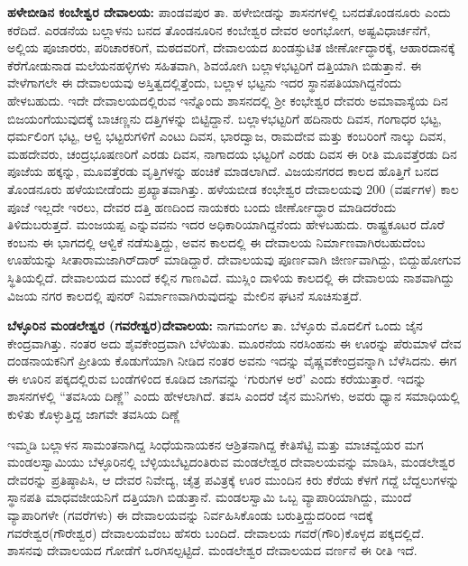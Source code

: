 \textbf{ಹಳೇಬೀಡಿನ ಕಂಬೇಶ್ವರ ದೇವಾಲಯ:} ಪಾಂಡವಪುರ ತಾ. ಹಳೇಬೀಡನ್ನು ಶಾಸನಗಳಲ್ಲಿ ಬನದತೊಂಡನೂರು ಎಂದು ಕರೆದಿದೆ. ಎರಡನೆಯ ಬಲ್ಲಾಳನು ಬನದ ತೊಂಡನೂರಿನ ಕಂಬೇಶ್ವರ ದೇವರ ಅಂಗಭೋಗ, ಅಷ್ಟವಿಧಾರ್ಚನೆಗೆ, ಅಲ್ಲಿಯ ಪೂಜಾರರು, ಪರಿಚಾರಕರಿಗೆ, ಮಠದವರಿಗೆ, ದೇವಾಲಯದ ಖಂಡಸ್ಫುಟಿತ ಜೀರ್ಣೋದ್ಧಾರಕ್ಕೆ, ಆಹಾರದಾನಕ್ಕೆ ಕೆರೆಗೋಡುನಾಡ ಮಲೆಯನಹಳ್ಳಿಗಳು ಸಹಿತವಾಗಿ, ಶಿವಯೋಗಿ ಬಲ್ಲಾಳಭಟ್ಟರಿಗೆ ದತ್ತಿಯಾಗಿ ಬಿಡುತ್ತಾನೆ. ಈ ವೇಳೆಗಾಗಲೇ ಈ ದೇವಾಲಯವು ಅಸ್ತಿತ್ವದಲ್ಲಿತ್ತೆಂದು, ಬಲ್ಲಾಳ ಭಟ್ಟನು ಇದರ ಸ್ಥಾನಪತಿಯಾಗಿದ್ದನೆಂದು ಹೇಳಬಹುದು. ಇದೇ ದೇವಾಲಯ\-ದಲ್ಲಿರುವ ಇನ್ನೊಂದು ಶಾಸನದಲ್ಲಿ ಶ‍್ರೀ ಕಂಭೇಶ್ವರ ದೇವರು ಅಮಾವಾಸ್ಯೆಯ ದಿನ ಬಿಜಯಂಗೆಯುವುದಕ್ಕೆ ಬಾಚಣ್ಣನು ದತ್ತಿಗಳನ್ನು ಬಿಟ್ಟಿದ್ದಾನೆ. ಬಲ್ಲಾಳಭಟ್ಟರಿಗೆ ಹದಿನಾರು ದಿವಸ, ಗಂಗಾಧರ ಭಟ್ಟ, ಧರ್ಮಲಿಂಗ ಭಟ್ಟ, ಆಳ್ವಿ ಭಟ್ಟರುಗಳಿಗೆ ಎಂಟು ದಿವಸ, ಭಾರದ್ವಾಜ, ರಾಮದೇವ ಮತ್ತು ಕಂಬರಿಂಗೆ ನಾಲ್ಕು ದಿವಸ, ಮಹದೇವರು, ಚಂದ್ರಭೂಷಣರಿಗೆ ಎರಡು ದಿವಸ, ನಾಗಾದಯ ಭಟ್ಟರಿಗೆ ಎರಡು ದಿವಸ ಈ ರೀತಿ ಮೂವತ್ತೆರಡು ದಿನ ಪೂಜೆಯ ಹಕ್ಕನ್ನು, ಮೂವತ್ತೆರಡು ವೃತ್ತಿಗಳನ್ನು ಹಂಚಿಕೆ ಮಾಡಲಾಗಿದೆ. ವಿಜಯನಗರದ ಕಾಲದ ಹೊತ್ತಿಗೆ ಬನದ ತೊಂಡನೂರು ಹಳೆಯಬೀಡೆಂದು ಪ್ರಖ್ಯಾತವಾಗಿತ್ತು. ಹಳೆಯಬೀಡ ಕಂಭೇಶ್ವರ ದೇವಾಲಯವು 200 (ವರ್ಷಗಳ) ಕಾಲ ಪೂಜೆ ಇಲ್ಲದೇ ಇರಲು, ದೇವರ ದತ್ತಿ ಹಣದಿಂದ ನಾಯಕರು ಬಂದು ಜೀರ್ಣೋದ್ಧಾರ ಮಾಡಿದರೆಂದು ತಿಳಿದುಬರುತ್ತದೆ. ಮಂಜಯಪ್ಪ ಎನ್ನುವವನು ಇದರ ಅಧಿಕಾರಿಯಾಗಿದ್ದನೆಂದು ಹೇಳಬಹುದು. ರಾಷ್ಟ್ರಕೂಟರ ದೊರೆ ಕಂಬನು ಈ ಭಾಗದಲ್ಲಿ ಆಳ್ವಿಕೆ ನಡೆಸುತ್ತಿದ್ದು, ಅವನ ಕಾಲದಲ್ಲಿ ಈ ದೇವಾಲಯ ನಿರ್ಮಾಣವಾಗಿರಬಹುದೆಂಬ ಊಹೆಯನ್ನು ಸೀತಾರಾಮಜಾಗಿರ್​ದಾರ್​ ಮಾಡಿದ್ದಾರೆ. ದೇವಾಲಯವು ಪೂರ್ಣವಾಗಿ ಜೀರ್ಣವಾಗಿದ್ದು, ಬಿದ್ದುಹೋಗುವ ಸ್ಥಿತಿಯಲ್ಲಿದೆ. ದೇವಾಲಯದ ಮುಂದೆ ಕಲ್ಲಿನ ಗಾಣವಿದೆ. ಮುಸ್ಲಿಂ ದಾಳಿಯ ಕಾಲದಲ್ಲಿ ಈ ದೇವಾಲಯ ನಾಶವಾಗಿದ್ದು ವಿಜಯ ನಗರ ಕಾಲದಲ್ಲಿ ಪುನರ್ ನಿರ್ಮಾಣವಾಗಿರುವುದನ್ನು ಮೇಲಿನ ಘಟನೆ ಸೂಚಿಸುತ್ತದೆ.

\textbf{ಬೆಳ್ಳೂರಿನ ಮಂಡಲೇಶ್ವರ (ಗವರೇಶ್ವರ)ದೇವಾಲಯ:} ನಾಗಮಂಗಲ ತಾ. ಬೆಳ್ಳೂರು ಮೊದಲಿಗೆ ಒಂದು ಜೈನ ಕೇಂದ್ರವಾಗಿತ್ತು. ನಂತರ ಅದು ಶೈವಕೇಂದ್ರವಾಗಿ ಬೆಳೆಯಿತು. ಮೂರನೆಯ ನರಸಿಂಹನು ಈ ಊರನ್ನು ಪೆರುಮಾಳೆ ದೇವ ದಂಡನಾಯಕನಿಗೆ ಪ್ರೀತಿಯ ಕೊಡುಗೆಯಾಗಿ ನೀಡಿದ ನಂತರ ಅವನು ಇದನ್ನು ವೈಷ್ಣವಕೇಂದ್ರವನ್ನಾಗಿ ಬೆಳೆಸಿದನು. ಈಗ ಈ ಊರಿನ ಪಕ್ಕದಲ್ಲಿರುವ ಬಂಡೆಗಳಿಂದ ಕೂಡಿದ ಜಾಗವನ್ನು `ಗುರುಗಳ ಅರೆ' ಎಂದು ಕರೆಯುತ್ತಾರೆ. ಇದನ್ನು ಶಾಸನಗಳಲ್ಲಿ “ತವಸಿಯ ದಿಣ್ಣೆ” ಎಂದು ಹೇಳಲಾಗಿದೆ. ತವಸಿ ಎಂದರೆ ಜೈನ ಮುನಿಗಳು, ಅವರು ಧ್ಯಾನ ಸಮಾಧಿಯಲ್ಲಿ ಕುಳಿತು ಕೊಳ್ಳುತ್ತಿದ್ದ ಜಾಗವೇ ತವಸಿಯ ದಿಣ್ಣೆ

ಇಮ್ಮಡಿ ಬಲ್ಲಾಳನ ಸಾಮಂತನಾಗಿದ್ದ ಸಿಂಧೆಯನಾಯಕನ ಆಶ್ರಿತನಾಗಿದ್ದ ಕೇತಿಸೆಟ್ಟಿ ಮತ್ತು ಮಾಚವ್ವೆಯರ ಮಗ ಮಂಡಲಸ್ವಾಮಿಯು ಬೆಳ್ಳೂರಿನಲ್ಲಿ ಬೆಳ್ಳಿಯಬೆಟ್ಟದಂತಿರುವ ಮಂಡಲೇಶ್ವರ ದೇವಾಲಯವನ್ನು ಮಾಡಿಸಿ, ಮಂಡಲೇಶ್ವರ ದೇವರನ್ನು ಪ್ರತಿಷ್ಠಾಪಿಸಿ, ಆ ದೇವರ ನಿವೇದ್ಯ, ಚೈತ್ರ ಪವಿತ್ರಕ್ಕೆ ಊರ ಮುಂದಿನ ಕಿರು ಕೆರೆಯ ಕೆಳಗೆ ಗದ್ದೆ ಬೆದ್ದಲುಗಳನ್ನು ಸ್ಥಾನಪತಿ ಮಾಧವಜೀಯನಿಗೆ ದತ್ತಿಯಾಗಿ ಬಿಡುತ್ತಾನೆ. ಮಂಡಲಸ್ವಾಮಿ ಒಬ್ಬ ವ್ಯಾಪಾರಿಯಾಗಿದ್ದು, ಮುಂದೆ ವ್ಯಾಪಾರಿಗಳೇ (ಗವರೆಗಳು) ಈ ದೇವಾಲಯವನ್ನು ನಿರ್ವಹಿಸಿಕೊಂಡು ಬರುತ್ತಿದ್ದುದರಿಂದ ಇದಕ್ಕೆ ಗವರೇಶ್ವರ(ಗೌರೇಶ್ವರ) ದೇವಾಲಯವೆಂಬ ಹೆಸರು ಬಂದಿದೆ. ದೇವಾಲಯ ಗವರೆ(ಗೌರಿ)ಕೊಳ್ಳದ ಪಕ್ಕದಲ್ಲಿದೆ. ಶಾಸನವು ದೇವಾಲಯದ ಗೋಡೆಗೆ ಒರಗಿಸಲ್ಪಟ್ಟಿದೆ. ಮಂಡಲೇಶ್ವರ ದೇವಾಲಯದ ವರ್ಣನೆ ಈ ರೀತಿ ಇದೆ.

